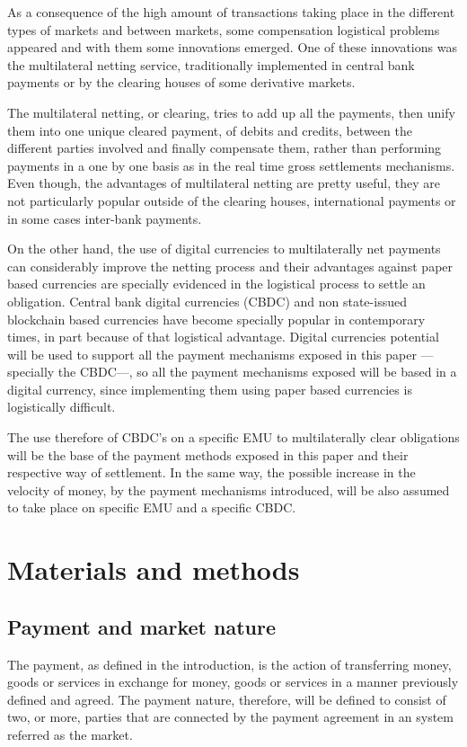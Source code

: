 \documentclass[12pt]{article}
\begin{document}
\begin{multicols}{2}
As a consequence of the high amount of transactions taking place in the different types of markets and between markets, some compensation logistical problems appeared and with them some innovations emerged. One of these innovations was the multilateral netting service, traditionally implemented in central bank payments or by the clearing houses of some derivative markets. 

The multilateral netting, or clearing, tries to add up all the payments, then unify them into one unique cleared payment, of debits and credits, between the different parties involved and finally compensate them, rather than performing payments in a one by one basis as in the real time gross settlements mechanisms. Even though, the advantages of multilateral netting are pretty useful, they are not particularly popular outside of the clearing houses, international payments or in some cases inter-bank payments. 

On the other hand, the use of digital currencies to multilaterally net payments can considerably improve the netting process and their advantages against paper based currencies are specially evidenced in the logistical process to settle an obligation. Central bank digital currencies (CBDC) and non state-issued blockchain based currencies have become specially popular in contemporary times, in part because of that logistical advantage. Digital currencies potential will be used to support all the payment mechanisms exposed in this paper ---specially the CBDC---, so all the payment mechanisms exposed will be based in a digital currency, since implementing them using paper based currencies is logistically difficult.

The use therefore of CBDC's on a specific EMU to multilaterally clear obligations will be the base of the payment methods exposed in this paper and their respective way of settlement. In the same way, the possible increase in the velocity of money, by the payment mechanisms introduced, will be also assumed to take place on specific EMU and a specific CBDC.

\section{Materials and methods}
\subsection{Payment and market nature}
The payment, as defined in the introduction, is the action of transferring money, goods or services in exchange for money, goods or services in a manner previously defined and agreed. The payment nature, therefore, will be defined to consist of two, or more, parties that are connected by the payment agreement in an system referred as the market. 


\end{multicols}
\end{document}
